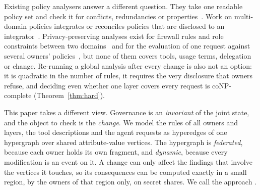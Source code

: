 Existing policy analysers answer a different question. They take one readable policy set and check it for conflicts, redundancies or properties~\cite{fisler2005margrave,hu2013anomalies,lin2010exam,backes2018zelkova,barnett2025authz,cutler2024cedar}. Work on multi-domain policies integrates or reconciles policies that are disclosed to an integrator~\cite{bonatti2002algebra,mazzoleni2008integration,mcdaniel2006reconciliation}. Privacy-preserving analyses exist for firewall rules and role constraints between two domains~\cite{chen2013firewall,liu2020smer} and for the evaluation of one request against several owners' policies~\cite{sheikhalishahi2019multiparty}, but none of them covers tools, usage terms, delegation or change. Re-running a global analysis after every change is also not an option: it is quadratic in the number of rules, it requires the very disclosure that owners refuse, and deciding even whether one layer covers every request is coNP-complete (Theorem~\ref{thm:hard}).

This paper takes a different view. Governance is an \emph{invariant} of the joint state, and the object to check is the \emph{change}. We model the rules of all owners and layers, the tool descriptions and the agent requests as hyperedges of one hypergraph over shared attribute-value vertices. The hypergraph is \emph{federated}, because each owner holds its own fragment, and \emph{dynamic}, because every modification is an event on it. A change can only affect the findings that involve the vertices it touches, so its consequences can be computed exactly in a small region, by the owners of that region only, on secret shares. We call the approach \name.

